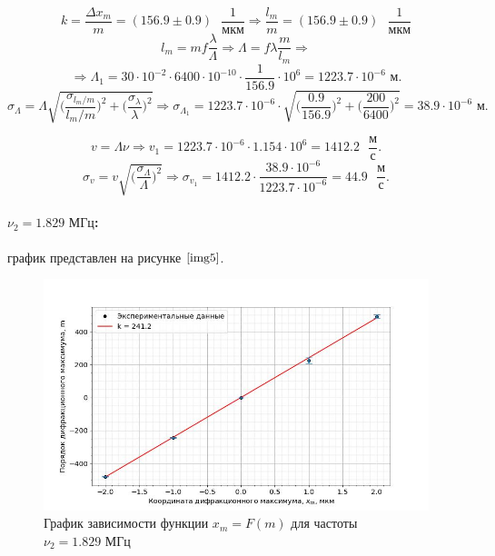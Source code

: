 \documentclass[a4paper,12pt]{article} %
\begin{document}
\[ k = \frac{\Delta x_{m}}{m} = (156.9\pm0.9)\text{ }\frac{1}{\text{мкм}} \Rightarrow \frac{l_{m}}{m} = (156.9\pm0.9)\text{ }\frac{1}{\text{мкм}} \]
\[ l_{m}=mf\frac{\lambda}{\Lambda} \Rightarrow \Lambda = f\lambda\frac{m}{l_{m}} \Rightarrow  \]
\[ \Rightarrow \Lambda_1 = 30\cdot10^{-2}\cdot6400\cdot10^{-10}\cdot\frac{1}{156.9}\cdot10^{6}=1223.7\cdot10^{-6}\text{ м}. \]
\[ \sigma_{\Lambda} = \Lambda\sqrt{\Big(\frac{\sigma_{l_{m}/m}}{l_{m}/m}\Big)^2+ \Big(\frac{\sigma_{\lambda}}{\lambda}\Big)^2} \Rightarrow \sigma_{\Lambda_1} = 1223.7\cdot10^{-6}\cdot\sqrt{\Big(\frac{0.9}{156.9}\Big)^2+\Big(\frac{200}{6400}\Big)^2} = 38.9\cdot10^{-6}\text{ м}. \]

\centering{}

\[ v=\Lambda\nu \Rightarrow v_1=1223.7\cdot10^{-6}\cdot1.154\cdot10^{6}=1412.2\text{ }\frac{\text{м}}{\text{с}}. \]
\[ \sigma_{v} = v\sqrt{\Big(\frac{\sigma_{\Lambda}}{\Lambda}\Big)^2} \Rightarrow \sigma_{v_1} = 1412.2\cdot\frac{38.9\cdot10^{-6}}{1223.7\cdot10^{-6}} = 44.9\text{ }\frac{\text{м}}{\text{с}}. \]


\newpage

\raggedright\paragraph{$\nu_2=1.829\text{ МГц}$:} график представлен на рисунке $\ref{img5}$.

\begin{figure}[h]
    \begin{center}
        \includegraphics[width=16cm]{image2.jpg}
    \end{center}
    \caption{График зависимости функции $x_m=F(m)$ для частоты $\nu_2=1.829\text{ МГц}$}
    \label{img5}
\end{figure}
\end{document}
